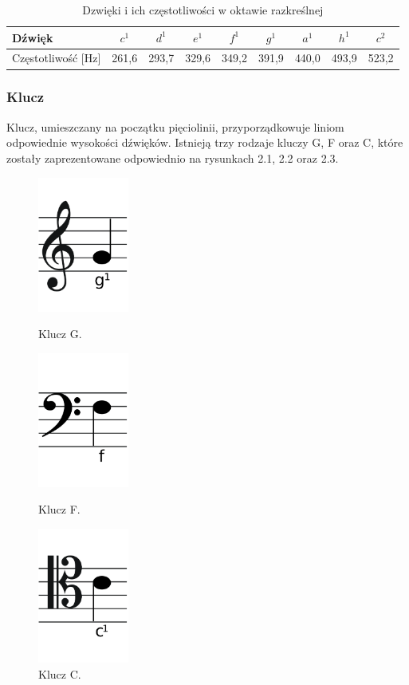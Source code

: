 \documentclass[printmode, eng, openany]{mgr}
\newcommand\tab[1][1cm]{\hspace*{#1}}
\begin{document}
\begin{table}[!htb]
\centering
\caption{Dzwięki i ich częstotliwości w oktawie razkreślnej \cite{tab}}
\begin{tabular}{|l|c|c|c|c|c|c|c|c|}
\hline
Dźwięk & $c^{1}$ & $d^{1}$ & $e^{1}$ & $f^{1}$ & $g^{1}$ & $a^{1}$ & $h^{1}$ & $c^{2}$  \\
\hline
Częstotliwość [Hz] & 261,6 & 293,7 & 329,6 & 349,2 & 391,9 & 440,0 & 493,9 & 523,2 \\
\hline
\end{tabular}
\end{table}
\subsubsection{Klucz}
\tab Klucz, umieszczany na początku pięciolinii, przyporządkowuje liniom odpowiednie wysokości dźwięków. Istnieją trzy rodzaje kluczy G, F oraz C, które zostały zaprezentowane odpowiednio na rysunkach 2.1, 2.2 oraz 2.3.

\begin{figure}[!htb]
\begin{minipage}{0.31\textwidth}
\centering
\includegraphics[width=3cm]{G}
\caption{Klucz G.}
\end{minipage}
\begin{minipage}{0.31\textwidth}
\centering
\includegraphics[width=3cm]{F}
\caption{Klucz F.}
\end{minipage}
\begin{minipage}{0.31\textwidth}
\centering
\includegraphics[width=3cm]{C}
\caption{Klucz C.}
\end{minipage}
\end{figure}
\end{document}
